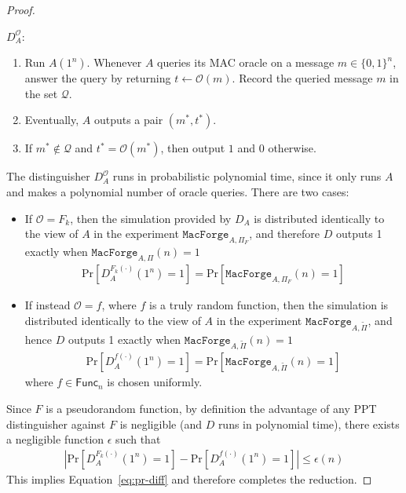 \begin{proof}
\begin{center}
\vspace*{1em}
\begin{minipage}{0.7\textwidth}
$D_A^{\mathcal{O}}:$
\begin{enumerate}[leftmargin=3em]
\item Run $A(1^n)$. Whenever $A$ queries its MAC oracle on a message $m \in \{0,1\}^n$, answer the query by returning $t \gets \mathcal{O}(m)$. Record the queried message $m$ in the set $\mathcal{Q}$.
\item Eventually, $A$ outputs a pair $(m^*, t^*)$.
\item If $m^* \notin \mathcal{Q}$ and $t^* = \mathcal{O}(m^*)$, then output $1$ and $0$ otherwise.
\end{enumerate}
\end{minipage}
\end{center}

The distinguisher $D_A^{\mathcal{O}}$ runs in probabilistic polynomial time, since it only runs $A$ and makes a polynomial number of oracle queries. There are two cases:
\begin{itemize}
    \item If $\mathcal{O} = F_k$, then the simulation provided by $D_A$ is distributed identically to the view of $A$ in the experiment $\mathtt{MacForge}_{A,\Pi_F}$, and therefore $D$ outputs 1 exactly when $\mathtt{MacForge}_{A,\Pi}(n) = 1$ 
    \begin{align}\label{eq:macforgeF-to-DF}
        \mathrm{Pr}[D_A^{F_k(\cdot)}(1^n) = 1] = \mathrm{Pr}[\mathtt{MacForge}_{A,\Pi_F}(n) = 1]         
    \end{align}
    \item If instead $\mathcal{O} = f$, where $f$ is a truly random function, then the simulation is distributed identically to the view of $A$ in the experiment $\mathtt{MacForge}_{A,\widetilde{\Pi}}$, and hence $D$ outputs 1 exactly when $\mathtt{MacForge}_{A,\widetilde{\Pi}}(n) = 1$ 
    \begin{align}\label{eq:macforgef-to-Df}
       \mathrm{Pr}[D_A^{f(\cdot)}(1^n) = 1] = \mathrm{Pr}[\mathtt{MacForge}_{A,\widetilde{\Pi}}(n) = 1]  
    \end{align}
    where $f \in \mathsf{Func}_n$ is chosen uniformly.
\end{itemize}

Since $F$ is a pseudorandom function, by definition the advantage of any PPT distinguisher against $F$ is negligible (and $D$ runs in polynomial time), there exists a negligible function $\epsilon$ such that
\begin{align}
\left|\mathrm{Pr}[D_A^{F_k(\cdot)}(1^n) = 1] - \mathrm{Pr}[D_A^{f(\cdot)}(1^n) = 1] \right| \leq \epsilon(n)
\end{align}
This implies Equation~\ref{eq:pr-diff} and therefore completes the reduction.
\end{proof}